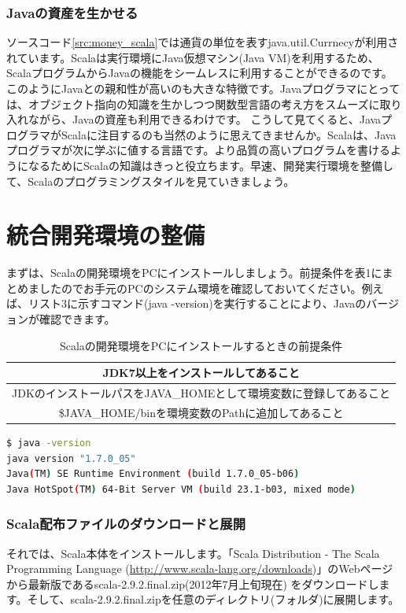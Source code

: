 \documentclass[10pt]{jarticle}
\begin{document}
\section*{Javaの資産を生かせる}
ソースコード\ref{src:money_scala}では通貨の単位を表すjava.util.Currnecyが利用されています。Scalaは実行環境にJava仮想マシン(Java VM)を利用するため、ScalaプログラムからJavaの機能をシームレスに利用することができるのです。このようにJavaとの親和性が高いのも大きな特徴です。Javaプログラマにとっては、オブジェクト指向の知識を生かしつつ関数型言語の考え方をスムーズに取り入れながら、Javaの資産も利用できるわけです。 こうして見てくると、JavaプログラマがScalaに注目するのも当然のように思えてきませんか。Scalaは、Javaプログラマが次に学ぶに値する言語です。より品質の高いプログラムを書けるようになるためにScalaの知識はきっと役立ちます。早速、開発実行環境を整備して、Scalaのプログラミングスタイルを見ていきましょう。
\part{統合開発環境の整備}
まずは、Scalaの開発環境をPCにインストールしましょう。前提条件を表1にまとめましたのでお手元のPCのシステム環境を確認しておいてください。例えば、リスト3に示すコマンド(java -version)を実行することにより、Javaのバージョンが確認できます。 

\begin{table}[htb]
  \caption{Scalaの開発環境をPCにインストールするときの前提条件}
  \begin{center}
    \begin{tabular}{|c|} \hline
      JDK7以上をインストールしてあること\\ \hline
      JDKのインストールパスをJAVA\_HOMEとして環境変数に登録してあること\\ \hline
      \$JAVA\_HOME/binを環境変数のPathに追加してあること\\ \hline 
    \end{tabular}
  \end{center}
  \label{tb:table1}
\end{table}

\begin{lstlisting}[language=bash, frame=none, label=cmd:java, caption=Javaのバージョンを確認する方法]
$ java -version
java version "1.7.0_05"
Java(TM) SE Runtime Environment (build 1.7.0_05-b06)
Java HotSpot(TM) 64-Bit Server VM (build 23.1-b03, mixed mode)
\end{lstlisting}

\section{Scala配布ファイルのダウンロードと展開}
それでは、Scala本体をインストールします。「Scala Distribution - The Scala Programming Language (\url{http://www.scala-lang.org/downloads})」のWebページから最新版であるscala-2.9.2.final.zip(2012年7月上旬現在) をダウンロードします。そして、scala-2.9.2.final.zipを任意のディレクトリ(フォルダ)に展開します。
\end{document}
